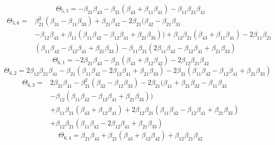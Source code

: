 \documentclass{article}
\begin{document}
\begin{equation}
    \Theta_{5,5}=-\beta_{21}\beta_{43}-\beta_{21}(\beta_{43}+\beta_{11}\beta_{41})-\beta_{11}\beta_{21}\beta_{41}
\end{equation}
\begin{equation}
    \begin{array}{ll}
    \Theta_{5,6}=&\beta_{21}^{2}(\beta_{31}-\beta_{11}\beta_{33})+\beta_{21}\beta_{42}-2\beta_{21}(\beta_{42}-\beta_{21}\beta_{31}\\
    &-\beta_{12}\beta_{43}+\beta_{11}(\beta_{11}\beta_{42}-\beta_{12}\beta_{41}+\beta_{21}\beta_{33}))
    +\beta_{12}\beta_{21}(\beta_{43}+\beta_{11}\beta_{41})-2\beta_{11}\beta_{21}\\
    &(\beta_{11}\beta_{42}-\beta_{12}\beta_{41}+\beta_{21}\beta_{33})
    -\beta_{11}\beta_{21}(2\beta_{11}\beta_{42}-\beta_{12}\beta_{41}+\beta_{21}\beta_{33})
    \end{array}
\end{equation}
\begin{equation}
    \Theta_{6,1}=-2\beta_{21}\beta_{43}-\beta_{21}(\beta_{43}+\beta_{12}\beta_{42})-2\beta_{12}\beta_{21}\beta_{42}
\end{equation}
\begin{equation}
    \Theta_{6,2}=2\beta_{12}\beta_{21}\beta_{41}-\beta_{21}(\beta_{11}\beta_{42}-2\beta_{12}\beta_{41}+\beta_{21}\beta_{33})
    -2\beta_{21}(\beta_{11}\beta_{42}-\beta_{12}\beta_{41}+\beta_{21}\beta_{33})
\end{equation}
\begin{equation}
    \begin{array}{ll}
    \Theta_{6,3}=&2\beta_{21}\beta_{41}-\beta_{21}^{2}(\beta_{32}-\beta_{12}\beta_{33})
    -2\beta_{21}(\beta_{41}+\beta_{21}\beta_{32}-\beta_{11}\beta_{43}\\
    &-\beta_{12}(\beta_{11}\beta_{42}-\beta_{12}\beta_{41}+\beta_{21}\beta_{33}))\\
    &+\beta_{11}\beta_{21}(\beta_{43}+\beta_{12}\beta_{41})+2\beta_{12}\beta_{21}
    (\beta_{11}\beta_{42}-\beta_{12}\beta_{41}+\beta_{21}\beta_{33})\\
    &+\beta_{12}\beta_{21}(\beta_{11}\beta_{42}-2\beta_{12}\beta_{41}+\beta_{21}\beta_{33})
    \end{array}
\end{equation}
\begin{equation}
    \Theta_{6,4}=\beta_{21}\beta_{43}+\beta_{21}(\beta_{43}+\beta_{12}\beta_{42})+\beta_{12}\beta_{21}\beta_{42}
\end{equation}
\end{document}
